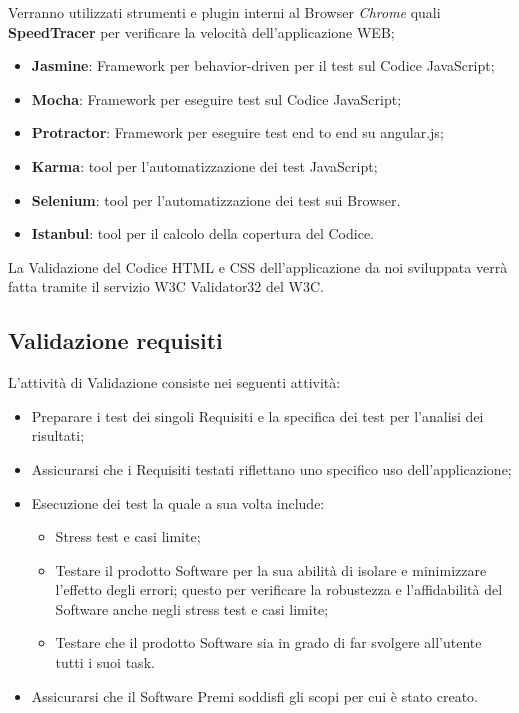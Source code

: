 {	
	Verranno utilizzati strumenti e plugin interni al Browser \emph{Chrome} quali \textbf{SpeedTracer} per verificare la velocità dell'applicazione WEB;
	
	\begin{itemize}
	\label{sec:strumentiTest}
    \item \textbf{Jasmine}: Framework per behavior-driven per il test sul Codice JavaScript;
	\item \textbf{Mocha}: Framework per eseguire test sul Codice JavaScript;
	\item \textbf{Protractor}: Framework per eseguire test end to end su angular.js;
	\item \textbf{Karma}: tool per l'automatizzazione dei test JavaScript;
	\item \textbf{Selenium}: tool per l'automatizzazione dei test sui Browser.
	\item \textbf{Istanbul}: tool per il calcolo della copertura del Codice.
   \end{itemize}
	
	
	La Validazione del Codice HTML e CSS dell’applicazione da noi sviluppata verrà
	fatta tramite il servizio W3C Validator32 del W3C.

		\subsection{Validazione requisiti}
		L'attività di Validazione consiste nei seguenti attività:
		\begin{itemize}
		\item Preparare i test dei singoli Requisiti e la specifica dei test per l'analisi dei risultati;
		\item Assicurarsi che i Requisiti testati riflettano uno specifico uso dell'applicazione;
		\item Esecuzione dei test la quale a sua volta include:
			\begin{itemize}
				\item Stress test e casi limite;
				\item Testare il prodotto Software per la sua abilità di isolare e minimizzare l'effetto degli errori; questo per verificare la robustezza e l’affidabilità del Software anche negli stress test e casi limite;
				\item Testare che il prodotto Software sia in grado di far svolgere all'utente tutti i suoi task.
			\end{itemize}
		\item Assicurarsi che il Software Premi soddisfi gli scopi per cui è stato creato.
		\end{itemize}		
}
